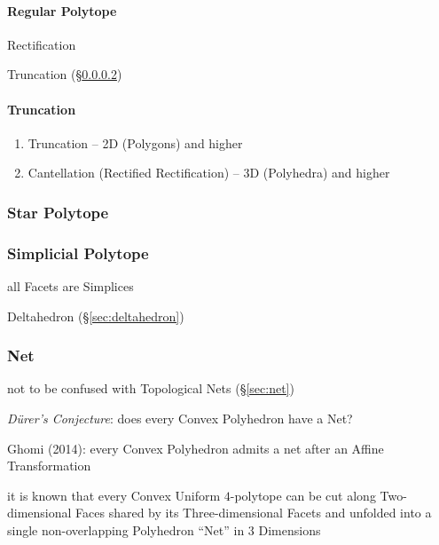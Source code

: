 \paragraph{Regular Polytope}\label{sec:regular_polytope}\hfill

Rectification

Truncation (\S\ref{sec:truncation_operator})



\paragraph{Truncation}\label{sec:truncation_operator}\hfill

\begin{enumerate}
  \item Truncation -- 2D (Polygons) and higher
  \item Cantellation (Rectified Rectification) -- 3D (Polyhedra) and higher
\end{enumerate}



\subsubsection{Star Polytope}\label{sec:star_polytope}

\subsubsection{Simplicial Polytope}\label{sec:simplicial_polytope}

all Facets are Simplices

Deltahedron (\S\ref{sec:deltahedron})



\subsubsection{Net}\label{sec:polytope_net}

\fist not to be confused with Topological Nets (\S\ref{sec:net})

\emph{D\"urer's Conjecture}: does every Convex Polyhedron have a Net?

Ghomi (2014): every Convex Polyhedron admits a net after an Affine
Transformation

it is known that every Convex Uniform $4$-polytope can be cut along
Two-dimensional Faces shared by its Three-dimensional Facets and unfolded into
a single non-overlapping Polyhedron ``Net'' in $3$ Dimensions



